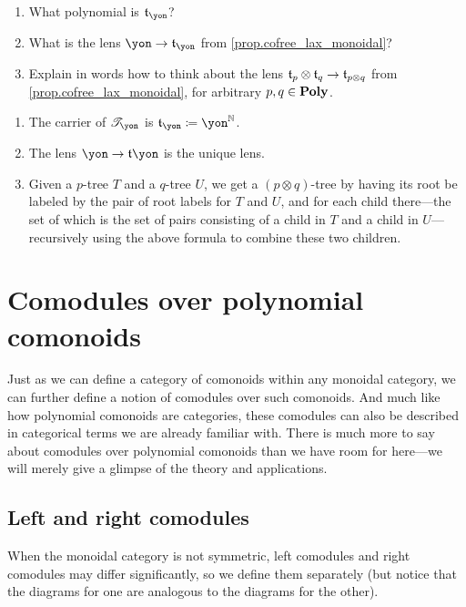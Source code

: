 \documentclass[Book-Poly]{subfiles}
\begin{document}
\begin{exercise}
\begin{enumerate}
	\item What polynomial is $\car{t}_\yon$?
	\item What is the lens $\yon\to\car{t}_\yon$ from \cref{prop.cofree_lax_monoidal}?
	\item Explain in words how to think about the lens $\mathfrak{t}_p\otimes\mathfrak{t}_q\to\mathfrak{t}_{p\otimes q}$ from \cref{prop.cofree_lax_monoidal}, for arbitrary $p,q\in\mathbf{Poly}$.
\qedhere
\end{enumerate}
\begin{solution}
\begin{enumerate}
    \item The carrier of $\cofree{\yon}$ is $\car{t}_\yon\coloneqq\yon^\nn$.
    \item The lens $\yon\to\car{t}\yon$ is the unique lens.
    \item Given a $p$-tree $T$ and a $q$-tree $U$, we get a $(p\otimes q)$-tree by having its root be labeled by the pair of root labels for $T$ and $U$, and for each child there---the set of which is the set of pairs consisting of a child in $T$ and a child in $U$---recursively using the above formula to combine these two children.
\end{enumerate}
\end{solution}
\end{exercise}


\section{Comodules over polynomial comonoids}

Just as we can define a category of comonoids within any monoidal category, we can further define a notion of comodules over such comonoids.
And much like how polynomial comonoids are categories, these comodules can also be described in categorical terms we are already familiar with.
There is much more to say about comodules over polynomial comonoids than we have room for here---we will merely give a glimpse of the theory and applications.

\subsection{Left and right comodules}

When the monoidal category is not symmetric, left comodules and right comodules may differ significantly, so we define them separately (but notice that the diagrams for one are analogous to the diagrams for the other).
\end{document}
